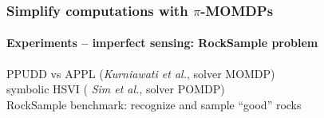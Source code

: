 \documentclass[12pt,svgnames,table]{beamer}
\begin{document}
\begin{frame}
\frametitle{Simplify computations with $\pi$-MOMDPs}
\framesubtitle{\footnotesize Experiments -- imperfect sensing: RockSample problem}
\vspace{-0.1cm}
	\begin{exampleblock}{}
	PPUDD vs APPL {\footnotesize (\textit{Kurniawati et al.}, solver MOMDP)} \\
 	\hspace{1cm} symbolic HSVI {\footnotesize ( \textit{Sim et al.}, solver POMDP)} \\
	{ \color{red!70} RockSample benchmark}: recognize and sample ``good'' rocks
	\end{exampleblock}
\end{frame}
\end{document}
